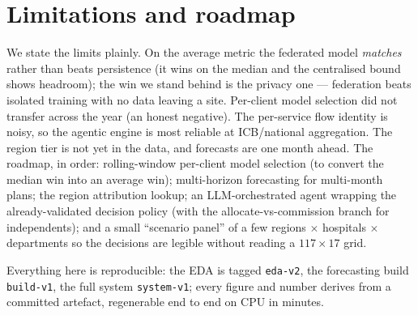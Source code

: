\documentclass[11pt,a4paper]{article}
\newcommand{\code}[1]{\texttt{\small #1}}
\begin{document}
\section{Limitations and roadmap}\label{sec:limits}
We state the limits plainly. On the average metric the federated model \emph{matches} rather than beats
persistence (it wins on the median and the centralised bound shows headroom); the win we stand behind is
the privacy one --- federation beats isolated training with no data leaving a site. Per-client model
selection did not transfer across the year (an honest negative). The per-service flow identity is noisy,
so the agentic engine is most reliable at ICB/national aggregation. The region tier is not yet in the
data, and forecasts are one month ahead. The roadmap, in order: rolling-window per-client model
selection (to convert the median win into an average win); multi-horizon forecasting for multi-month
plans; the region attribution lookup; an LLM-orchestrated agent wrapping the already-validated decision
policy (with the allocate-vs-commission branch for independents); and a small ``scenario panel'' of a
few regions $\times$ hospitals $\times$ departments so the decisions are legible without reading a
$117\times17$ grid.

Everything here is reproducible: the EDA is tagged \code{eda-v2}, the forecasting build \code{build-v1},
the full system \code{system-v1}; every figure and number derives from a committed artefact, regenerable
end to end on CPU in minutes.

\appendix
\end{document}
